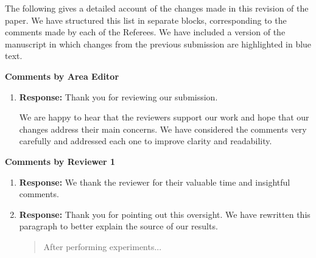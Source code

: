 \documentclass[10pt]{article}
\renewcommand{\theenumi}{(\roman{enumi})}
\renewcommand{\labelenumi}{\theenumi}
\begin{document}
\bigskip

The following gives a detailed account of the changes made in this revision of the paper. We have structured this list in separate blocks, corresponding to the comments made by each of the Referees.  We have included a version of the manuscript in which changes from the previous submission are highlighted in blue text. 






 \hspace*{-25pt} \textbf{\large Comments by Area Editor}
 \begin{enumerate}
   \renewcommand{\labelenumi}{[AE:\,\arabic{enumi}]}

 \item {} 

\textbf{Response:}  Thank you for reviewing our submission.

We are happy to hear that the reviewers support our work and hope that our changes address their main concerns. We have considered the comments very carefully and addressed each one to improve clarity and readability. %

\end{enumerate}


\bigskip
\hspace*{-25pt} \textbf{\large Comments by Reviewer 1}\\



\begin{enumerate}
  \renewcommand{\labelenumi}{[R1:\,\arabic{enumi}]}


 \item {}

 \textbf{Response: } We thank the reviewer for their valuable time and insightful comments.


 \item {}
 \textbf{Response: } Thank you for pointing out this oversight.  We have rewritten this paragraph to better explain the source of our results.
 
 \begin{quote}
    After performing experiments...   
 \end{quote}

\end{enumerate}
\end{document}
